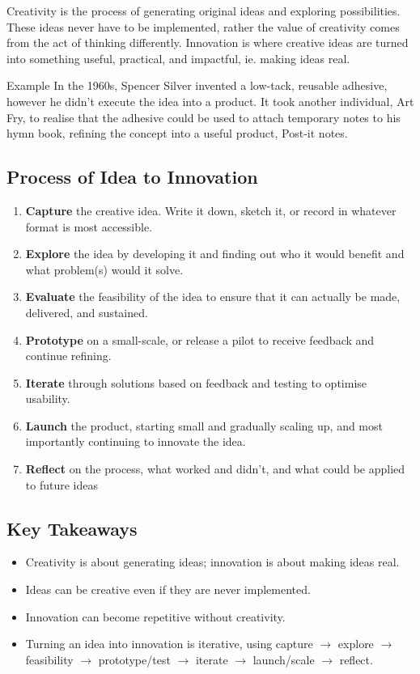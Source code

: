 \documentclass{report}
\begin{document}
		Creativity is the process of generating original ideas and exploring possibilities. These ideas never have to be implemented, rather the value of creativity comes from the act of thinking differently. Innovation is where creative ideas are turned into something useful, practical, and impactful, ie. making ideas real.

		\begin{question}{Example}
			In the 1960s, Spencer Silver invented a low-tack, reusable adhesive, however he didn't execute the idea into a product. It took another individual, Art Fry, to realise that the adhesive could be used to attach temporary notes to his hymn book, refining the concept into a useful product, Post-it notes.
		\end{question}

		\subsection{Process of Idea to Innovation}

			\begin{enumerate}
				\item \textbf{Capture} the creative idea. Write it down, sketch it, or record in whatever format is most accessible.
				\item \textbf{Explore} the idea by developing it and finding out who it would benefit and what problem(s) would it solve.
				\item \textbf{Evaluate} the feasibility of the idea to ensure that it can actually be made, delivered, and sustained.
				\item \textbf{Prototype} on a small-scale, or release a pilot to receive feedback and continue refining. 
				\item \textbf{Iterate} through solutions based on feedback and testing to optimise usability.
				\item \textbf{Launch} the product, starting small and gradually scaling up, and most importantly continuing to innovate the idea.
				\item \textbf{Reflect} on the process, what worked and didn't, and what could be applied to future ideas
			\end{enumerate}

		\subsection{Key Takeaways}

			\begin{itemize}
				\item Creativity is about generating ideas; innovation is about making ideas real.
				\item Ideas can be creative even if they are never implemented.
				\item Innovation can become repetitive without creativity.
				\item Turning an idea into innovation is iterative, using capture $\rightarrow$ explore $\rightarrow$ feasibility $\rightarrow$ prototype/test $\rightarrow$ iterate $\rightarrow$ launch/scale $\rightarrow$ reflect.
			\end{itemize}
\end{document}
